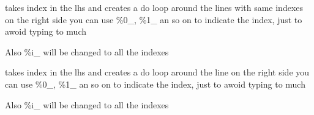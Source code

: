 \documentclass[letterpaper,10pt,english]{sphinxmanual}
\begin{document}

\begin{fulllineitems}
\label{\detokenize{onboard/modelmanipulation:modelmanipulation.dosubst}}
\pysigstartsignatures
{}
\pysigstopsignatures
\end{fulllineitems}


\begin{fulllineitems}
\label{\detokenize{onboard/modelmanipulation:modelmanipulation.doablekeep}}
\pysigstartsignatures
{}
\pysigstopsignatures
\sphinxAtStartPar
takes index in the lhs and creates a do loop around the lines with same indexes
on the right side you can use \%0\_, \%1\_ an so on to indicate the index, just to awoid typing to much

\sphinxAtStartPar
Also \%i\_ will be changed to all the indexes

\end{fulllineitems}


\begin{fulllineitems}
\label{\detokenize{onboard/modelmanipulation:modelmanipulation.doable}}
\pysigstartsignatures
{}
\pysigstopsignatures
\sphinxAtStartPar
takes index in the lhs and creates a do loop around the line
on the right side you can use \%0\_, \%1\_ an so on to indicate the index, just to awoid typing to much

\sphinxAtStartPar
Also \%i\_ will be changed to all the indexes

\end{fulllineitems}

\end{document}
